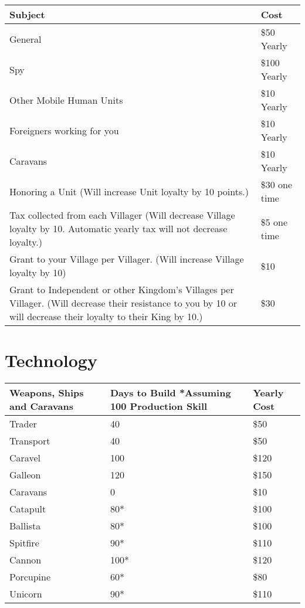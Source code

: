 \begin{center}
\begin{tabular}{ | p{2in} | p{2in} |}
	\hline
	Subject	& Cost \\ \hline
General	& \$50 Yearly \\ \hline
Spy	& \$100 Yearly \\ \hline
Other Mobile Human Units	& \$10 Yearly \\ \hline
Foreigners working for you	& \$10 Yearly \\ \hline
Caravans	& \$10 Yearly \\ \hline
Honoring a Unit (Will increase Unit loyalty by 10 points.)	& \$30 one time \\ \hline
Tax collected from each Villager (Will decrease Village loyalty by 10. Automatic yearly tax will not decrease loyalty.)	& \$5 one time \\ \hline
Grant to your Village per Villager. (Will increase Village loyalty by 10)	& \$10 \\ \hline 
Grant to Independent or other Kingdom’s Villages per Villager. (Will decrease their resistance to you by 10 or will decrease their loyalty to their King by 10.)	& \$30 \\ \hline 
\end{tabular}
\end{center}

\section{Technology}

\begin{center}
\begin{tabular}{|p{1.3in}|p{1.3in}|p{1.3in}|}
	\hline
	Weapons, Ships and Caravans	&  Days to Build *Assuming 100 Production Skill & Yearly Cost \\ \hline
Trader	& 40 & \$50 \\ \hline
Transport	& 40 & \$50 \\ \hline
Caravel	& 100 & \$120 \\ \hline
Galleon	& 120 & \$150 \\ \hline
Caravans	& 0 & \$10 \\ \hline
Catapult	& 80* & \$100 \\ \hline
Ballista	& 80* & \$100 \\ \hline
Spitfire	& 90* & \$110 \\ \hline 
Cannon	& 100* & \$120 \\ \hline 
Porcupine	& 60* & \$80 \\ \hline 
Unicorn	& 90* & \$110 \\ \hline 
\end{tabular}
\end{center}

